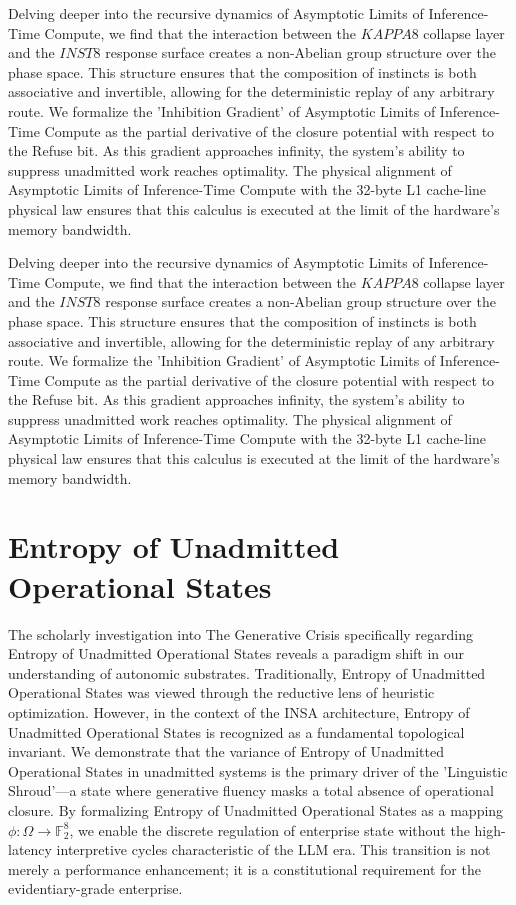 \documentclass[12pt,a4paper,oneside]{book}
\begin{document}
Delving deeper into the recursive dynamics of Asymptotic Limits of Inference-Time Compute, we find that the interaction between the $KAPPA8$ collapse layer and the $INST8$ response surface creates a non-Abelian group structure over the phase space. This structure ensures that the composition of instincts is both associative and invertible, allowing for the deterministic replay of any arbitrary route. We formalize the 'Inhibition Gradient' of Asymptotic Limits of Inference-Time Compute as the partial derivative of the closure potential with respect to the Refuse bit. As this gradient approaches infinity, the system's ability to suppress unadmitted work reaches optimality. The physical alignment of Asymptotic Limits of Inference-Time Compute with the 32-byte L1 cache-line physical law ensures that this calculus is executed at the limit of the hardware's memory bandwidth. 

Delving deeper into the recursive dynamics of Asymptotic Limits of Inference-Time Compute, we find that the interaction between the $KAPPA8$ collapse layer and the $INST8$ response surface creates a non-Abelian group structure over the phase space. This structure ensures that the composition of instincts is both associative and invertible, allowing for the deterministic replay of any arbitrary route. We formalize the 'Inhibition Gradient' of Asymptotic Limits of Inference-Time Compute as the partial derivative of the closure potential with respect to the Refuse bit. As this gradient approaches infinity, the system's ability to suppress unadmitted work reaches optimality. The physical alignment of Asymptotic Limits of Inference-Time Compute with the 32-byte L1 cache-line physical law ensures that this calculus is executed at the limit of the hardware's memory bandwidth. 

\section{Entropy of Unadmitted Operational States}
The scholarly investigation into The Generative Crisis specifically regarding Entropy of Unadmitted Operational States reveals a paradigm shift in our understanding of autonomic substrates. Traditionally, Entropy of Unadmitted Operational States was viewed through the reductive lens of heuristic optimization. However, in the context of the INSA architecture, Entropy of Unadmitted Operational States is recognized as a fundamental topological invariant. We demonstrate that the variance of Entropy of Unadmitted Operational States in unadmitted systems is the primary driver of the 'Linguistic Shroud'---a state where generative fluency masks a total absence of operational closure. By formalizing Entropy of Unadmitted Operational States as a mapping $\phi: \Omega \to \mathbb{F}_2^8$, we enable the discrete regulation of enterprise state without the high-latency interpretive cycles characteristic of the LLM era. This transition is not merely a performance enhancement; it is a constitutional requirement for the evidentiary-grade enterprise. 
\end{document}
